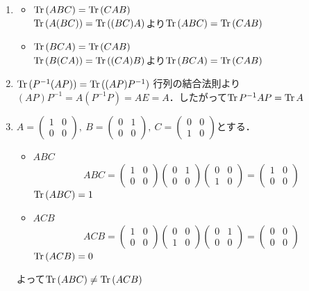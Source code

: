 \documentclass[dvipdfmx]{jsreport}
\begin{document}
\begin{souanswer}
\begin{enumerate}
	\item 
\begin{itemize}
	\item $\operatorname{Tr}{(ABC)}= \operatorname{Tr}{(CAB)}$\\
	$\operatorname{Tr}{(A(BC))}= \operatorname{Tr}{((BC)A)}$より$\operatorname{Tr}{(ABC)}= \operatorname{Tr}{(CAB)}$
	\item $\operatorname{Tr}{(BCA)}= \operatorname{Tr}{(CAB)}$\\
	$\operatorname{Tr}{(B(CA))}= \operatorname{Tr}{((CA)B)}$より$\operatorname{Tr}{(BCA)}= \operatorname{Tr}{(CAB)}$
\end{itemize}

	\item $\operatorname{Tr}{(P^{-1}(AP))}= \operatorname{Tr}{((AP)P^{-1})}$
	行列の結合法則より$(AP)P^{-1}= A(P^{-1}P)= AE= A$．したがって$\operatorname{Tr}{P^{-1}AP}= \operatorname{Tr}{A}$

	\item $A= \begin{pmatrix}1& 0\\ 0& 0\end{pmatrix},\ B= \begin{pmatrix}0& 1\\ 0& 0\end{pmatrix},\ C= \begin{pmatrix}0& 0\\ 1& 0\end{pmatrix}$とする．
\begin{itemize}
	\item $ABC$
\begin{equation*}
	ABC= \begin{pmatrix}1& 0\\ 0& 0\end{pmatrix}\begin{pmatrix}0& 1\\ 0& 0\end{pmatrix}\begin{pmatrix}0& 0\\ 1& 0\end{pmatrix}= \begin{pmatrix}1& 0\\ 0& 0\end{pmatrix}
\end{equation*}
	$\operatorname{Tr}{(ABC)}= 1$

	\item $ACB$
\begin{equation*}
	ACB= \begin{pmatrix}1& 0\\ 0& 0\end{pmatrix}\begin{pmatrix}0& 0\\ 1& 0\end{pmatrix}\begin{pmatrix}0& 1\\ 0& 0\end{pmatrix}= \begin{pmatrix}0& 0\\ 0& 0\end{pmatrix}
\end{equation*}
	$\operatorname{Tr}{(ACB)}= 0$
\end{itemize}
	よって$\operatorname{Tr}{(ABC)}\ne \operatorname{Tr}{(ACB)}$
\end{enumerate}
\end{souanswer}
\end{document}
